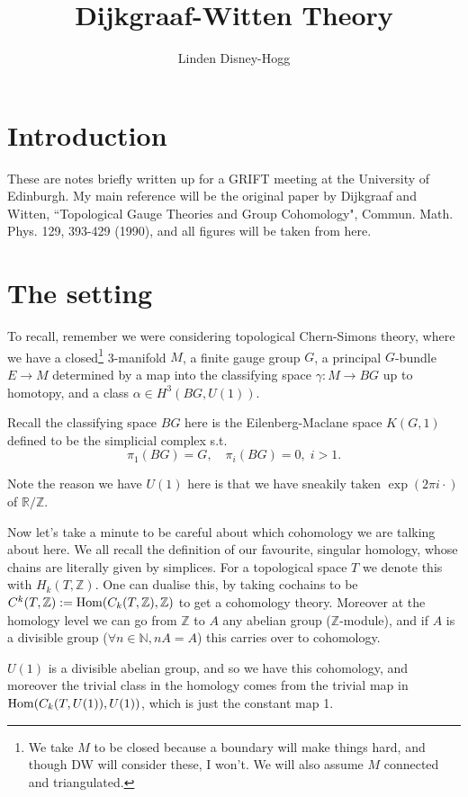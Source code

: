 \documentclass{article}
\title{Dijkgraaf-Witten Theory}
\author{Linden Disney-Hogg}
\date{}
\begin{document}
\maketitle
\tableofcontents

\section{Introduction}
These are notes briefly written up for a GRIFT meeting at the University of Edinburgh. My main reference will be the original paper by Dijkgraaf and Witten, ``Topological Gauge Theories and Group Cohomology", Commun. Math. Phys. 129, 393-429 (1990), and all figures will be taken from here.  

\section{The setting}
To recall, remember we were considering topological Chern-Simons theory, where we have a closed\footnote{We take $M$ to be closed because a boundary will make things hard, and though DW will consider these, I won't. We will also assume $M$ connected and triangulated.} 3-manifold $M$, a finite gauge group $G$, a principal $G$-bundle $E\to M$ determined by a map into the classifying space $\gamma : M \to BG$ up to homotopy, and a class $\alpha \in H^3(BG, U(1))$. 

\begin{remark}
	Recall the classifying space $BG$ here is the Eilenberg-Maclane space $K(G,1)$ defined to be the simplicial complex s.t. 
	\[
	\pi_1(BG) = G, \quad \pi_i(BG)=0, \; i>1.
	\]
\end{remark}

\begin{remark}
	Note the reason we have $U(1)$ here is that we have sneakily taken $\exp(2\pi i \cdot)$ of $\mathbb{R}/\mathbb{Z}$. 
	
	Now let's take a minute to be careful about which cohomology we are talking about here. We all recall the definition of our favourite, singular homology, whose chains are literally given by simplices. For a topological space $T$ we denote this with $H_k(T, \mathbb{Z})$. One can dualise this, by taking cochains to be $C^k(T, \mathbb{Z}) := \operatorname{Hom}(C_k(T, \mathbb{Z}), \mathbb{Z})$ to get a cohomology theory. Moreover at the homology level we can go from $\mathbb{Z}$ to $A$ any abelian group ($\mathbb{Z}$-module), and if $A$ is a divisible group ($\forall n \in \mathbb{N}, nA=A$) this carries over to cohomology.
	
	
	$U(1)$ is a divisible abelian group, and so we have this cohomology, and moreover the trivial class in the homology comes from the trivial map in $\operatorname{Hom}(C_k(T, U(1)), U(1))$, which is just the constant map 1. 
\end{remark}
\end{document}
